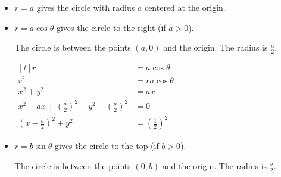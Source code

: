 \begin{itemize}
    \item $r = a$ gives the circle with radius $a$ centered at the origin.

    \begin{center}
    \end{center}

    \item $r = a\cos{\theta}$ gives the circle to the right (if $a > 0$).
    
    The circle is between the points $(a, 0)$ and the origin. The radius is $\frac{a}{2}$.

    $\begin{aligned}[t]
        r                                                                        & = a \cos{\theta}             \\
        r^2                                                                      & = r a \cos{\theta}           \\
        x^2 + y^2                                                                & = ax                         \\
        x^2 - ax + \left(\frac{a}{2}\right)^2 + y^2 - \left(\frac{a}{2}\right)^2 & = 0                          \\
        \left(x - \frac{a}{2}\right)^2 + y^2                                     & = \left(\frac{1}{2}\right)^2
    \end{aligned}$

    \item $r = b\sin{\theta}$ gives the circle to the top (if $b > 0$).

    The circle is between the points $(0, b)$ and the origin. The radius is $\frac{b}{2}$.
\end{itemize}

